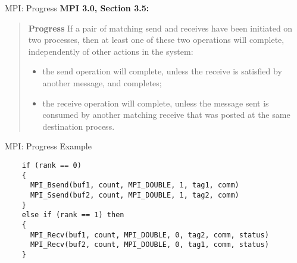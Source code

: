 \documentclass[english,compress]{beamer}
\begin{document}
\begin{frame}{MPI: Progress}
  \textbf{MPI 3.0, Section 3.5:}

  \begin{quote}
    \upshape
    \textbf{Progress} If a pair of matching send and receives have
    been initiated on two processes, then at least one of these two
    operations will complete, independently of other actions in the
    system:

    \begin{itemize}
      \item the send operation will complete, unless the receive is
        satisfied by another message, and completes; 
      \item the receive operation will complete, unless the
        message sent is consumed by another matching receive that 
        was posted at the same destination process.
    \end{itemize}
  \end{quote}
\end{frame}
\begin{frame}[fragile]{MPI: Progress Example}
  \begin{lstlisting}
    if (rank == 0)
    {
      MPI_Bsend(buf1, count, MPI_DOUBLE, 1, tag1, comm)
      MPI_Ssend(buf2, count, MPI_DOUBLE, 1, tag2, comm)
    }
    else if (rank == 1) then
    {
      MPI_Recv(buf1, count, MPI_DOUBLE, 0, tag2, comm, status)
      MPI_Recv(buf2, count, MPI_DOUBLE, 0, tag1, comm, status)
    }
  \end{lstlisting}
\end{frame}












\questionframe{}
\imagecreditslide
\end{document}
